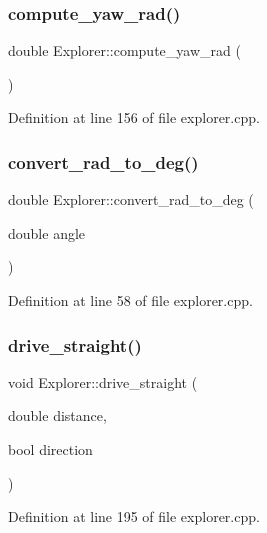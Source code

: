 \subsubsection{\texorpdfstring{compute\+\_\+yaw\+\_\+rad()}{compute\_yaw\_rad()}}
{\footnotesize\ttfamily double Explorer\+::compute\+\_\+yaw\+\_\+rad (\begin{DoxyParamCaption}{ }\end{DoxyParamCaption})}



Definition at line 156 of file explorer.\+cpp.

\mbox{\label{class_explorer_ac3a5c9368647dd9d2c36d12497bd889e}} 
\subsubsection{\texorpdfstring{convert\+\_\+rad\+\_\+to\+\_\+deg()}{convert\_rad\_to\_deg()}}
{\footnotesize\ttfamily double Explorer\+::convert\+\_\+rad\+\_\+to\+\_\+deg (\begin{DoxyParamCaption}\item[{double}]{angle }\end{DoxyParamCaption})}



Definition at line 58 of file explorer.\+cpp.

\mbox{\label{class_explorer_ab4ca9f16c48a60fc4d0e426b6fd9e9a0}} 
\subsubsection{\texorpdfstring{drive\+\_\+straight()}{drive\_straight()}}
{\footnotesize\ttfamily void Explorer\+::drive\+\_\+straight (\begin{DoxyParamCaption}\item[{double}]{distance,  }\item[{bool}]{direction }\end{DoxyParamCaption})}



Definition at line 195 of file explorer.\+cpp.

